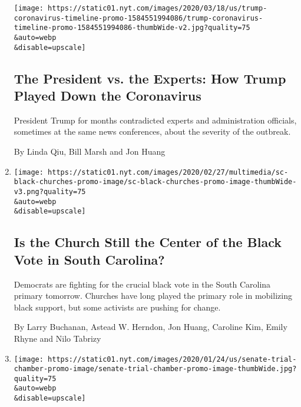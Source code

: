 \begin{enumerate}
  \texttt{[image: https://static01.nyt.com/images/2020/03/18/us/trump-coronavirus-timeline-promo-1584551994086/trump-coronavirus-timeline-promo-1584551994086-thumbWide-v2.jpg?quality=75\\\&auto=webp\\\&disable=upscale]}

  \hypertarget{the-president-vs-the-experts-how-trump-played-down-the-coronavirus}{%
  \subsection{The President vs. the Experts: How Trump Played Down the
  Coronavirus}\label{the-president-vs-the-experts-how-trump-played-down-the-coronavirus}}

  President Trump for months contradicted experts and administration
  officials, sometimes at the same news conferences, about the severity
  of the outbreak.

  By Linda Qiu, Bill Marsh and Jon Huang
\item
  \href{/interactive/2020/02/27/us/politics/black-church-elections.html}{}

  \texttt{[image: https://static01.nyt.com/images/2020/02/27/multimedia/sc-black-churches-promo-image/sc-black-churches-promo-image-thumbWide-v3.png?quality=75\\\&auto=webp\\\&disable=upscale]}

  \hypertarget{is-the-church-still-the-center-of-the-black-vote-in-south-carolina}{%
  \subsection{Is the Church Still the Center of the Black Vote in South
  Carolina?}\label{is-the-church-still-the-center-of-the-black-vote-in-south-carolina}}

  Democrats are fighting for the crucial black vote in the South
  Carolina primary tomorrow. Churches have long played the primary role
  in mobilizing black support, but some activists are pushing for
  change.

  By Larry Buchanan, Astead W. Herndon, Jon Huang, Caroline Kim, Emily
  Rhyne and Nilo Tabrizy
\item
  \href{/interactive/2020/01/23/us/politics/impeachment-senate-chamber-diagram.html}{}

  \texttt{[image: https://static01.nyt.com/images/2020/01/24/us/senate-trial-chamber-promo-image/senate-trial-chamber-promo-image-thumbWide.jpg?quality=75\\\&auto=webp\\\&disable=upscale]}

  \hypertarget{a-3-d-tour-of-how-the-senate-was-transformed-for-the-impeachment-trial}{%
}
\end{enumerate}
